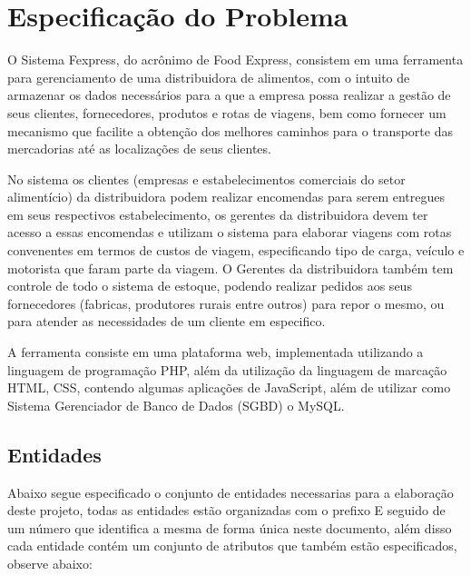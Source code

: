 \documentclass[12pt, onecolumn, titlepage]{article}
\begin{document}
\section{Especificação do Problema}
\label{sect:especificacao}

O Sistema Fexpress, do acrônimo de Food Express, consistem em uma ferramenta para gerenciamento de uma distribuidora de alimentos, com o intuito de armazenar os dados necessários para a que a empresa possa realizar a gestão de seus clientes, fornecedores, produtos e rotas de viagens, bem como fornecer um mecanismo que facilite a obtenção dos melhores caminhos para o transporte das mercadorias até as localizações de seus clientes.

No sistema os clientes (empresas e estabelecimentos comerciais do setor alimentício) da distribuidora podem realizar encomendas para serem entregues em seus respectivos estabelecimento, os gerentes da distribuidora devem ter acesso a essas encomendas e utilizam o sistema para elaborar viagens com rotas convenentes em termos de custos de viagem, especificando tipo de carga, veículo e motorista que faram parte da viagem. O Gerentes da distribuidora também tem controle de todo o sistema de estoque, podendo realizar pedidos aos seus fornecedores (fabricas, produtores rurais entre outros) para repor o mesmo, ou para atender as necessidades de um cliente em especifico.

A ferramenta consiste em uma plataforma web, implementada utilizando a linguagem de programação PHP, além da utilização da linguagem de marcação HTML, CSS, contendo algumas aplicações de JavaScript, além de utilizar como Sistema Gerenciador de Banco de Dados (SGBD) o MySQL.

\subsection{Entidades}
\label{sect:entidades}

Abaixo segue especificado o conjunto de entidades necessarias para a elaboração deste projeto, todas as entidades estão organizadas com o prefixo E seguido de um número que identifica a mesma de forma única neste documento, além disso cada entidade contém um conjunto de atributos que também estão especificados, observe abaixo:
\end{document}
